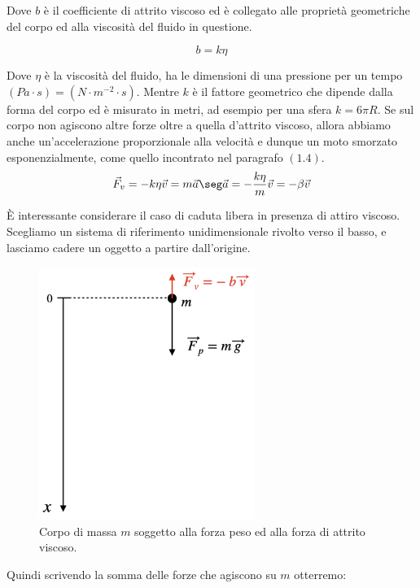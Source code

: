 Dove $b$ è il coefficiente di attrito viscoso ed è collegato alle proprietà geometriche del corpo ed alla viscosità del fluido in questione.

\begin{equation}
b = k\eta
\end{equation}

Dove $\eta$ è la viscosità del fluido, ha le dimensioni di una pressione per un tempo $(Pa \cdot s) =(N\cdot m^{-2}\cdot s)$. Mentre $k$ è il fattore geometrico che dipende dalla forma del corpo ed è misurato in metri, ad esempio per una sfera $k = 6\pi R$.
Se sul corpo non agiscono altre forze oltre a quella d'attrito viscoso, allora abbiamo anche un'accelerazione proporzionale alla velocità e dunque un moto smorzato esponenzialmente, come quello incontrato nel paragrafo $(1.4)$.
\begin{equation}
\vec F_v = -k\eta\vec v = m\vec a \seg \vec a = -\frac{k\eta}m\vec v = -\beta \vec v 
\end{equation}

È interessante considerare il caso di caduta libera in presenza di attiro viscoso. Scegliamo un sistema di riferimento unidimensionale rivolto verso il basso, e lasciamo cadere un oggetto a partire dall'origine. 

\begin{figure}[htbp]
\begin{center}
\includegraphics[width=7cm]{images/cadlibera.png}
\caption{Corpo di massa $m$ soggetto alla forza peso ed alla forza di attrito viscoso.}
\label{default}
\end{center}
\end{figure}

Quindi scrivendo la somma delle forze che agiscono su $m$ otterremo:

